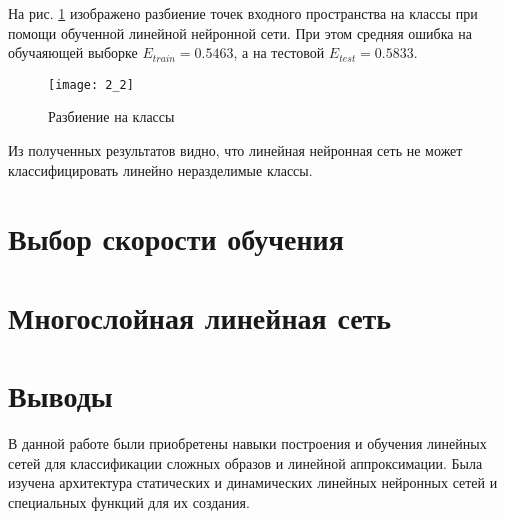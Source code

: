 На рис. \ref{fig:2_2} изображено разбиение точек входного пространства на классы при помощи обученной линейной нейронной сети. При этом средняя ошибка на обучаяющей выборке $E_{train} = 0.5463$, а на тестовой $E_{test} = 0.5833$.
\begin{figure}[H]
\begin{center}
	\texttt{[image: 2\_2]}
	\caption{Разбиение на классы}
	\label{fig:2_2}
\end{center}
\end{figure}

Из полученных результатов видно, что линейная нейронная сеть не может классифицировать линейно неразделимые классы.

\section{Выбор скорости обучения}


\section{Многослойная линейная сеть}


\section{Выводы}

В данной работе были приобретены навыки построения и обучения линейных сетей для классификации сложных образов и линейной аппроксимации. Была изучена архитектура статических и динамических линейных нейронных сетей и специальных функций для их создания.


